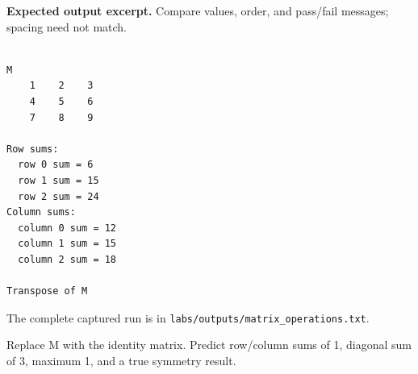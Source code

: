 \textbf{Expected output excerpt.} Compare values, order, and pass/fail messages; spacing need not match.

\begin{lstlisting}[style=utpterminal,language={}]

M
    1    2    3
    4    5    6
    7    8    9

Row sums:
  row 0 sum = 6
  row 1 sum = 15
  row 2 sum = 24
Column sums:
  column 0 sum = 12
  column 1 sum = 15
  column 2 sum = 18

Transpose of M

\end{lstlisting}

The complete captured run is in \texttt{labs/outputs/matrix\_operations.txt}.

\begin{tryit}

Replace M with the identity matrix. Predict row/column sums of 1, diagonal sum of 3, maximum 1, and a true symmetry result.

\end{tryit}
